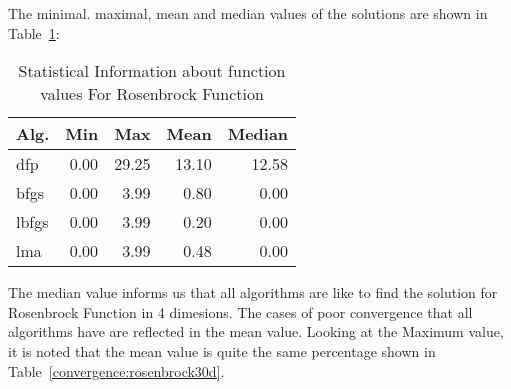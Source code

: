 
The minimal. maximal, mean and median values of the solutions are shown in Table~\ref{function_values:rosenbrock30d}:

\begin{table}[H]
\centering
\caption{Statistical Information about function values For Rosenbrock Function}
\label{function_values:rosenbrock30d}
\begin{tabular}{lrrrr}
\toprule
 Alg. &  Min &   Max &  Mean &  Median \\
\midrule
  dfp & 0.00 & 29.25 & 13.10 &   12.58 \\
 bfgs & 0.00 &  3.99 &  0.80 &    0.00 \\
lbfgs & 0.00 &  3.99 &  0.20 &    0.00 \\
  lma & 0.00 &  3.99 &  0.48 &    0.00 \\
\bottomrule
\end{tabular}
\end{table}

The median value informs us that all algorithms are like to find the solution
for Rosenbrock Function in 4 dimesions. The cases of poor convergence that all algorithms
have are reflected in the mean value. Looking at the Maximum value, it is noted that the mean value is
quite the same percentage shown in Table~\ref{convergence:rosenbrock30d}.
